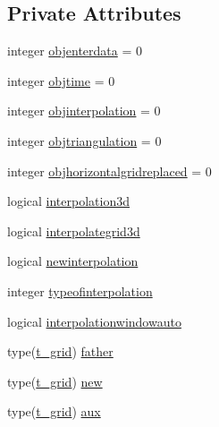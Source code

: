 \subsection*{Private Attributes}
\begin{DoxyCompactItemize}
\item 
integer \mbox{\hyperlink{structmoduleinterpolategrids_1_1t__interpolategrids_a6b549e2ddf97cb8fa21ca1272aaccf92}{objenterdata}} = 0
\item 
integer \mbox{\hyperlink{structmoduleinterpolategrids_1_1t__interpolategrids_a218d0ed96b797764f80a89b59f680a6e}{objtime}} = 0
\item 
integer \mbox{\hyperlink{structmoduleinterpolategrids_1_1t__interpolategrids_a94372035489984fb49026ebec4022d2f}{objinterpolation}} = 0
\item 
integer \mbox{\hyperlink{structmoduleinterpolategrids_1_1t__interpolategrids_a99a9691c839708c721b4f154838e2d4a}{objtriangulation}} = 0
\item 
integer \mbox{\hyperlink{structmoduleinterpolategrids_1_1t__interpolategrids_a3b59cefac2c2c06a2d15271b4e6dcc67}{objhorizontalgridreplaced}} = 0
\item 
logical \mbox{\hyperlink{structmoduleinterpolategrids_1_1t__interpolategrids_afb63dc2b6ce431ba6e195f3929aa3fa6}{interpolation3d}}
\item 
logical \mbox{\hyperlink{structmoduleinterpolategrids_1_1t__interpolategrids_a9edb6852a4ec23a2689e9ce8f94c1210}{interpolategrid3d}}
\item 
logical \mbox{\hyperlink{structmoduleinterpolategrids_1_1t__interpolategrids_adbf28b145897d10259e61d996317e857}{newinterpolation}}
\item 
integer \mbox{\hyperlink{structmoduleinterpolategrids_1_1t__interpolategrids_a6119f33d61e1d2e740bff9789925fab8}{typeofinterpolation}}
\item 
logical \mbox{\hyperlink{structmoduleinterpolategrids_1_1t__interpolategrids_a93c5c17746bafd4edfb42f35ab7b2062}{interpolationwindowauto}}
\item 
type(\mbox{\hyperlink{structmoduleinterpolategrids_1_1t__grid}{t\+\_\+grid}}) \mbox{\hyperlink{structmoduleinterpolategrids_1_1t__interpolategrids_a42095250bd1c87a5244610d27f4d84f9}{father}}
\item 
type(\mbox{\hyperlink{structmoduleinterpolategrids_1_1t__grid}{t\+\_\+grid}}) \mbox{\hyperlink{structmoduleinterpolategrids_1_1t__interpolategrids_ab7823ee2530f1085327010451d1b5379}{new}}
\item 
type(\mbox{\hyperlink{structmoduleinterpolategrids_1_1t__grid}{t\+\_\+grid}}) \mbox{\hyperlink{structmoduleinterpolategrids_1_1t__interpolategrids_ad2fa7829229ba4c24d69a0aaf6de41cc}{aux}}

\end{DoxyCompactItemize}
